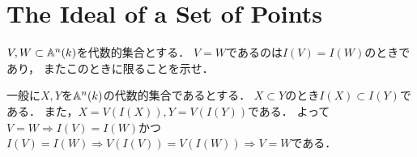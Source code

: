 \section{The Ideal of a Set of Points}

\begin{prob}
  $V,W \subset \mathbb{A}^n(k)$を代数的集合とする．
  $V = W$であるのは$I(V) = I(W)$のときであり，
  またこのときに限ることを示せ．
\end{prob}
\begin{ans}
  一般に$X,Y$を$\mathbb{A}^n(k)$の代数的集合であるとする．
  $X\subset Y$のとき$I(X) \subset I(Y)$である．
  また，$X = V(I(X)), Y = V(I(Y))$である．  
  よって$V = W \Rightarrow I(V) = I(W)$かつ
  $I(V) = I(W) \Rightarrow V(I(V)) = V(I(W)) \Rightarrow V = W$である．
\end{ans}
